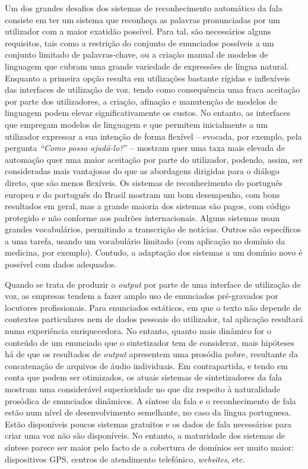 \documentclass[]{../metanetpaper}
\begin{document}
\begin{multicols}{2}
 Um dos grandes desafios dos sistemas de re\-co\-nhe\-ci\-men\-to automático da fala consiste em ter um sistema que reconheça as palavras pronunciadas por um utilizador com a maior exatidão possível. Para tal, são necessários alguns requisitos, tais como a res\-tri\-ção do conjunto de enunciados possíveis a um conjunto limitado de palavras-chave, ou a criação manual de modelos de linguagem que cubram uma grande variedade de expressões de língua natural. Enquanto a primeira opção resulta em utilizações bastante rígidas e inflexíveis das interfaces de utilização de voz, tendo como consequência uma fraca aceitação por parte dos utilizadores, a criação, afinação e manutenção de modelos de linguagem podem elevar significativamente os custos. No entanto, as interfaces que empregam modelos de linguagem e que permitem inicialmente a um utilizador expressar a sua intenção de forma flexível – evocada, por exemplo, pela pergunta \textit{“Como posso ajudá-lo?}” – mostram quer uma taxa mais elevada de automação quer uma maior aceitação por parte do utilizador, podendo, assim, ser consideradas mais vantajosas do que as abordagens dirigidas para o diálogo direto, que são menos flexíveis. Os sistemas de reconhecimento do português europeu e do português do Brasil mostram um bom desempenho, com bons resultados em geral, mas a grande maioria dos sistemas são pagos, com código protegido e não conforme aos padrões internacionais. Alguns sistemas usam grandes vocabulários, permitindo a transcrição de notícias. Outros são específicos a uma tarefa, usando um vocabulário limitado (com aplicação no domínio da medicina, por exemplo). Contudo, a adaptação dos sistemas a um domínio novo é possível com dados adequados.

Quando se trata de produzir o \textit{output} por parte de uma interface de utilização de voz, as empresas tendem a fazer amplo uso de enunciados pré-gravados por locutores profissionais. Para enunciados estáticos, em que o texto não depende de contextos par\-ti\-cu\-la\-res nem de dados pessoais do utilizador, tal aplicação resultará numa experiência enriquecedora. No entanto, quanto mais dinâmico for o conteúdo de um enunciado que o sintetizador tem de considerar, mais hipóteses há de que os resultados de \textit{output} apresentem uma prosódia pobre, resultante da concatenação de arquivos de áudio individuais. Em contrapartida, e tendo em conta que podem ser otimizados, os atuais sistemas de sintetizadores da fala mostram uma considerável superioridade no que diz respeito à naturalidade prosódica de enunciados dinâmicos. A síntese da fala e o reconhecimento de fala estão num nível de desenvolvimento semelhante, no caso da língua portuguesa. Estão disponíveis poucos sistemas gratuitos e os dados de fala necessários para criar uma voz não são disponíveis. No entanto, a maturidade dos sistemas de síntese parece ser maior pelo facto de a cobertura de domínios ser muito maior: dispositivos GPS, centros de atendimento telefónico, \textit{websites}, etc.


\end{multicols}
\end{document}
